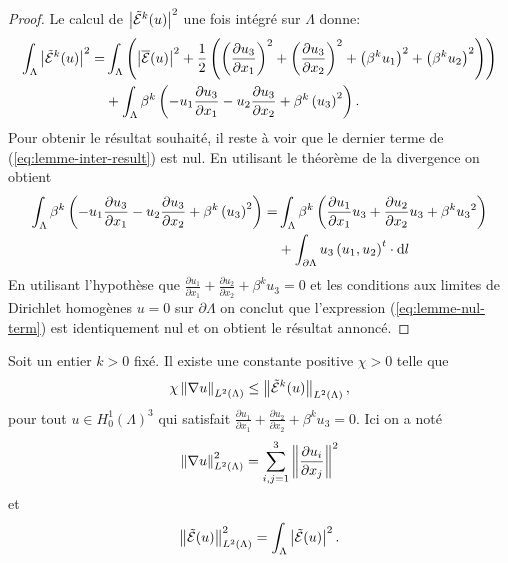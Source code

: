 \begin{proof}
  Le calcul de $\left\lvert \tilde{\mathcal E}^k(u) \right\rvert^2$ une fois
  intégré sur $\Lambda$ donne:
  \begin{align}
    \int_\Lambda \left\lvert \tilde{\mathcal E}^k(u) \right\rvert^2 =
    &\int_\Lambda \left( \left\lvert \overline{\mathcal E}(u) \right\rvert^2
    + \frac{1}{2}\left( 
      \left( \frac{\partial u_3}{\partial x_1} \right)^2
      + \left( \frac{\partial u_3}{\partial x_2} \right)^2
      + \left( \beta^k u_1 \right)^2
      + \left( \beta^k u_2 \right)^2 \right) \right)\nonumber\\
    &+ \int_\Lambda \beta^k\left( 
      - u_1 \frac{\partial u_3}{\partial x_1}
      - u_2 \frac{\partial u_3}{\partial x_2}
      + \beta^k\left( u_3 \right)^2
     \right).\label{eq:lemme-inter-result}
  \end{align}
  Pour obtenir le résultat souhaité, il reste à voir que le
  dernier terme de (\ref{eq:lemme-inter-result}) est nul.
  En utilisant le théorème de la divergence on obtient
  \begin{align}
    \int_\Lambda \beta^k\left( 
      - u_1 \frac{\partial u_3}{\partial x_1}
      - u_2 \frac{\partial u_3}{\partial x_2}
      + \beta^k\left( u_3 \right)^2 \right) =
    &\int_\Lambda\beta^k\left( 
        \frac{\partial u_1}{\partial x_1}u_3
      + \frac{\partial u_2}{\partial x_2}u_3 +
      \beta^k{u_3}^2 \right)\\
    &+ \int_{\partial \Lambda} u_3\left( u_1,
      u_2 \right)^t\cdot\mathrm dl\label{eq:lemme-nul-term}
  \end{align}
  En utilisant l'hypothèse que $\frac{\partial u_1}{\partial x_1} +
  \frac{\partial u_2}{\partial x_2} + \beta^k u_3 = 0$ et les
  conditions aux limites de Dirichlet homogènes $u = 0$ sur
  $\partial \Lambda$ on conclut que l'expression
  (\ref{eq:lemme-nul-term}) est identiquement nul et on obtient le
  résultat annoncé.
\end{proof}

\begin{lemme}\label{lem:2}
  Soit un entier $k > 0$ fixé. Il existe une constante positive $\chi >
  0$ telle que
  \begin{equation}
\chi \left\lVert \nabla u \right\rVert_{L^2(\Lambda)} \leq
\left\lVert \tilde{\mathcal E}^k(u) \right\rVert_{L^2(\Lambda)},
  \end{equation}
  pour tout $u \in H^1_0(\Lambda)^3$ qui satisfait $\frac{\partial
    u_1}{\partial x_1} + \frac{\partial u_2}{\partial x_2} +
  \beta^k u_3 = 0$. Ici on a noté
  \begin{equation}
    \left\lVert \nabla u \right\rVert_{L^2(\Lambda)}^2 = \sum_{i,j = 1}^3 \left\lVert \frac{\partial u_i}{\partial x_j} \right\rVert^2
  \end{equation}
  et
  \begin{equation}
    \left\lVert \tilde{\mathcal E}(u) \right\rVert^2_{L^2(\Lambda)} = \int_\Lambda \left\lvert \tilde{\mathcal E}(u) \right\rvert^2.
  \end{equation}
\end{lemme}

